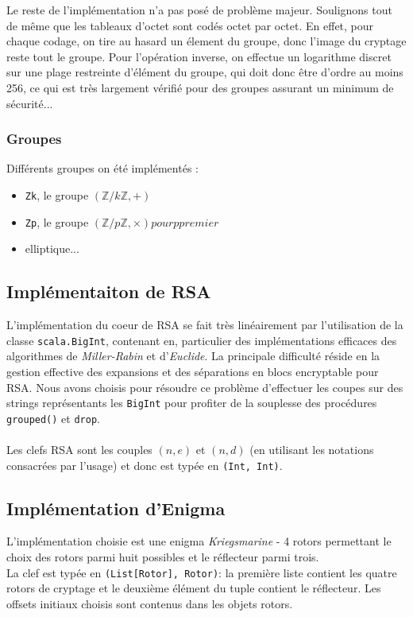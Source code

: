 \documentclass[11pt]{article} %
\begin{document}
Le reste de l'implémentation n'a pas posé de problème majeur. Soulignons tout de même que les tableaux d'octet sont codés octet par octet. En effet, pour chaque codage, on tire au hasard un élement du groupe, donc l'image du cryptage reste tout le groupe. Pour l'opération inverse, on effectue un logarithme discret sur une plage restreinte d'élément du groupe, qui doit donc être d'ordre au moins 256, ce qui est très largement vérifié pour des groupes assurant un minimum de sécurité...

\subsubsection{Groupes}

Différents groupes on été implémentés :
\begin{itemize}
  \item \texttt{Zk}, le groupe $(\mathbb{Z}/k\mathbb{Z}, +)$
  \item \texttt{Zp}, le groupe $(\mathbb{Z}/p\mathbb{Z}, \times) pour p premier$
  \item elliptique...
\end{itemize}

\subsection{Implémentaiton de RSA}

L'implémentation du coeur de RSA se fait très linéairement par l'utilisation de la classe \texttt{scala.BigInt}, contenant en, particulier des implémentations efficaces des algorithmes de \emph{Miller-Rabin} et d'\emph{Euclide}. La principale difficulté réside en la gestion effective des expansions et des séparations en blocs encryptable pour RSA. Nous avons choisis pour résoudre ce problème d'effectuer les coupes sur des strings représentants les \texttt{BigInt} pour profiter de la souplesse des procédures \texttt{grouped()} et \texttt{drop}. \\\\
Les clefs RSA sont les couples $(n,e)$ et $(n,d)$ (en utilisant les notations consacrées par l'usage) et donc est typée en 
\texttt{(Int, Int)}. 

\subsection{Implémentation d'Enigma}
L’implémentation choisie est une enigma \emph{Kriegsmarine} - 4 rotors permettant le choix des rotors parmi huit possibles et le réflecteur parmi trois.  \\
La clef est typée en \texttt{(List[Rotor], Rotor)}: la première liste contient les quatre rotors de cryptage et le deuxième élément du tuple contient le réflecteur. Les offsets initiaux choisis sont contenus dans les objets rotors.\\
\end{document}

